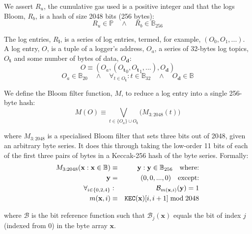 \documentclass[9pt,oneside]{amsart}
\begin{document}
\begin{multicols}{2}
We assert $R_u$, the cumulative gas used is a positive integer and that the logs Bloom, $R_b$, is a hash of size 2048 bits (256 bytes):
\begin{equation}
R_u \in \mathbb{P} \quad \wedge \quad R_b \in \mathbb{B}_{256}
\end{equation}


The log entries, $R_\mathbf{l}$, is a series of log entries, termed, for example, $(O_0, O_1, ...)$. A log entry, $O$, is a tuple of a logger's address, $O_a$, a series of 32-bytes log topics, $O_\mathbf{t}$ and some number of bytes of data, $O_\mathbf{d}$:
\begin{equation}
O \equiv (O_a, ({O_\mathbf{t}}_0, {O_\mathbf{t}}_1, ...), O_\mathbf{d})
\end{equation}
\begin{equation}
O_a \in \mathbb{B}_{20} \quad \wedge \quad \forall_{t \in O_\mathbf{t}}: t \in \mathbb{B}_{32} \quad \wedge \quad O_\mathbf{d} \in \mathbb{B}
\end{equation}

We define the Bloom filter function, $M$, to reduce a log entry into a single 256-byte hash:
\begin{equation}
M(O) \equiv \bigvee_{t \in \{O_a\} \cup O_\mathbf{t}} \big( M_{3:2048}(t) \big)
\end{equation}

where $M_{3:2048}$ is a specialised Bloom filter that sets three bits out of 2048, given an arbitrary byte series. It does this through taking the low-order 11 bits of each of the first three pairs of bytes in a Keccak-256 hash of the byte series. Formally:
\begin{eqnarray}
M_{3:2048}(\mathbf{x}: \mathbf{x} \in \mathbb{B}) & \equiv & \mathbf{y}: \mathbf{y} \in \mathbb{B}_{256} \quad \text{where:}\\
\mathbf{y} & = & (0, 0, ..., 0) \quad \text{except:}\\
\forall_{i \in \{0, 2, 4\}}&:& \mathcal{B}_{m(\mathbf{x}, i)}(\mathbf{y}) = 1\\
m(\mathbf{x}, i) &\equiv& \mathtt{\tiny KEC}(\mathbf{x})[i, i + 1] \bmod 2048
\end{eqnarray}

where $\mathcal{B}$ is the bit reference function such that $\mathcal{B}_j(\mathbf{x})$ equals the bit of index $j$ (indexed from 0) in the byte array $\mathbf{x}$.


\end{multicols}
\end{document}
